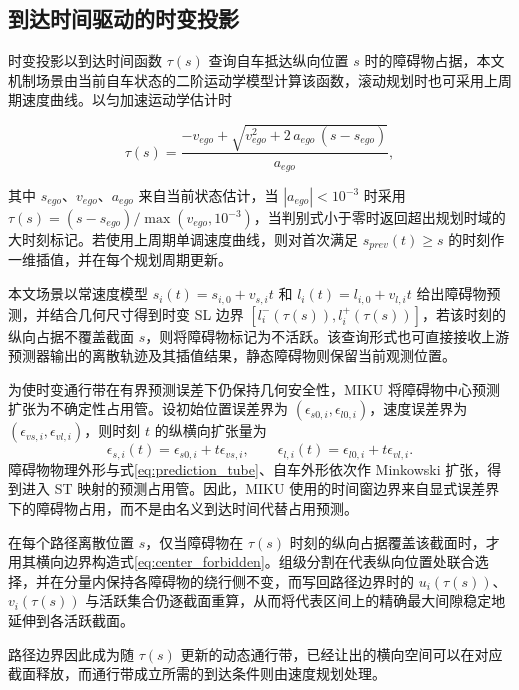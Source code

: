 \documentclass[a4paper,zihao=5]{ctexart}
\theoremstyle{definition}
\begin{document}
\subsection{到达时间驱动的时变投影}
\label{sec:method_corridor}

时变投影以到达时间函数 $\tau(s)$ 查询自车抵达纵向位置 $s$ 时的障碍物占据，本文机制场景由当前自车状态的二阶运动学模型计算该函数，滚动规划时也可采用上周期速度曲线。以匀加速运动学估计时

\begin{equation}
    \tau(s) = \frac{-v_{ego} + \sqrt{v_{ego}^{2} + 2\,a_{ego}\,(s - s_{ego})}}{a_{ego}},
    \label{eq:arrival_time}
\end{equation}

其中 $s_{ego}$、$v_{ego}$、$a_{ego}$ 来自当前状态估计，当 $|a_{ego}|<10^{-3}$ 时采用 $\tau(s)=(s-s_{ego})/\max(v_{ego},10^{-3})$，当判别式小于零时返回超出规划时域的大时刻标记。若使用上周期单调速度曲线，则对首次满足 $s_{prev}(t)\geq s$ 的时刻作一维插值，并在每个规划周期更新。

本文场景以常速度模型 $s_i(t)=s_{i,0}+v_{s,i}t$ 和 $l_i(t)=l_{i,0}+v_{l,i}t$ 给出障碍物预测，并结合几何尺寸得到时变 SL 边界 $[l_i^{-}(\tau(s)),l_i^{+}(\tau(s))]$，若该时刻的纵向占据不覆盖截面 $s$，则将障碍物标记为不活跃。该查询形式也可直接接收上游预测器输出的离散轨迹及其插值结果，静态障碍物则保留当前观测位置。

为使时变通行带在有界预测误差下仍保持几何安全性，MIKU 将障碍物中心预测扩张为不确定性占用管。设初始位置误差界为 $(\epsilon_{s0,i},\epsilon_{l0,i})$，速度误差界为 $(\epsilon_{vs,i},\epsilon_{vl,i})$，则时刻 $t$ 的纵横向扩张量为
\begin{equation}
 \epsilon_{s,i}(t)=\epsilon_{s0,i}+t\epsilon_{vs,i},\qquad
 \epsilon_{l,i}(t)=\epsilon_{l0,i}+t\epsilon_{vl,i}.
 \label{eq:prediction_tube}
\end{equation}
障碍物物理外形与式\eqref{eq:prediction_tube}、自车外形依次作 Minkowski 扩张，得到进入 ST 映射的预测占用管。因此，MIKU 使用的时间窗边界来自显式误差界下的障碍物占用，而不是由名义到达时间代替占用预测。

在每个路径离散位置 $s$，仅当障碍物在 $\tau(s)$ 时刻的纵向占据覆盖该截面时，才用其横向边界构造式\eqref{eq:center_forbidden}。组级分割在代表纵向位置处联合选择，并在分量内保持各障碍物的绕行侧不变，而写回路径边界时的 $u_i(\tau(s))$、$v_i(\tau(s))$ 与活跃集合仍逐截面重算，从而将代表区间上的精确最大间隙稳定地延伸到各活跃截面。

路径边界因此成为随 $\tau(s)$ 更新的动态通行带，已经让出的横向空间可以在对应截面释放，而通行带成立所需的到达条件则由速度规划处理。
\end{document}
